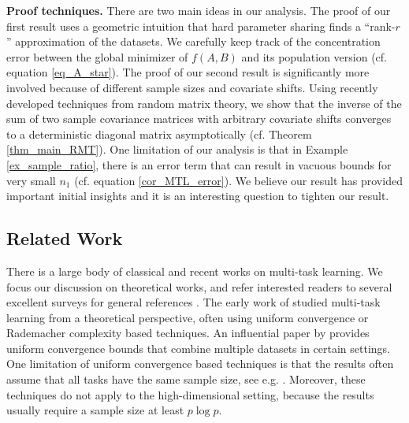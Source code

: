 \textbf{Proof techniques.}
There are two main ideas in our analysis. The proof of our first result uses a geometric intuition that hard parameter sharing finds a ``rank-$r$'' approximation of the datasets.
We carefully keep track of the concentration error between the global minimizer of $f(A, B)$ and its population version (cf. equation \eqref{eq_A_star}).
The proof of our second result is significantly more involved because of different sample sizes and covariate shifts. Using recently developed techniques from random matrix theory, we show that the inverse of the sum of two sample covariance matrices with arbitrary covariate shifts converges to a deterministic diagonal matrix asymptotically (cf. Theorem \ref{thm_main_RMT}). %
One limitation of our analysis is that in Example \ref{ex_sample_ratio}, there is an error term that can result in vacuous bounds for very small $n_1$ (cf. equation \eqref{cor_MTL_error}).
We believe our result has provided important initial insights and it is an interesting question to tighten our result.



\subsection{Related Work}

There is a large body of classical and recent works on multi-task learning.
We focus our discussion on theoretical works, and refer interested readers to several excellent surveys for general references \cite{PY09,ZY17,V20}.
The early work of \citet{B00,BS03,M06} studied multi-task learning from a theoretical perspective, often using uniform convergence or Rademacher complexity based techniques.
An influential paper by \citet{BBCK10} provides uniform convergence bounds that combine multiple datasets in certain settings.
One limitation of uniform convergence based techniques is that the results often assume that all  tasks have the same sample size, see e.g. \citet{B00,MPR16}.
Moreover, these techniques do not apply to the high-dimensional setting, because the results usually require a sample size at least $p \log p$.


